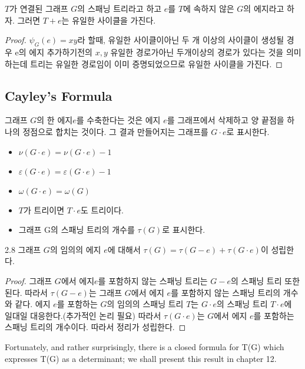 \begin{theorem}
    $T$가 연결된 그래프 $G$의 스패닝 트리라고 하고 $e$를 $T$에 속하지 않은 $G$의 에지라고 하자. 그러면 $T + e$는 유일한 사이클을 가진다.
\end{theorem}
\begin{proof}
    $\psi_G(e) = xy$라 할때, 유일한 사이클이아닌 두 개 이상의 사이클이 생성될 경우  e의 에지 추가하기전의 $x, y$ 유일한 경로가아닌 두개이상의 경로가 있다는 것을 의미하는데 트리는 유일한 경로임이 이미 증명되었으므로 유일한 사이클을 가진다.
\end{proof}
\subsection{Cayley's Formula}
\begin{dfn}[contract]
    그래프 $G$의 한 에지$e$를 수축한다는 것은 에지 $e$를 그래프에서 삭제하고 양 끝점을 하나의 정점으로 합치는 것이다. 그 결과 만들어지는 그래프를 $G \cdot e$로 표시한다.
    \begin{itemize}
        \item $\nu(G \cdot e) = \nu(G \cdot e) - 1$
        \item $\varepsilon(G \cdot e) = \varepsilon(G \cdot e)-1$
        \item $\omega(G \cdot e) = \omega(G)$
        \item  $T$가 트리이면 $T \cdot e$도 트리이다.
        \item 그래프 G의 스패닝 트리의 개수를 $\tau(G)$로 표시한다.
    \end{itemize}
\end{dfn}

\begin{theorem}
    2.8 그래프 $G$의 임의의 에지 $e$에 대해서 $\tau(G) =\tau(G-e) + \tau(G \cdot e)$이 성립한다.
\end{theorem}

\begin{proof}
    그래프 $G$에서 에지$e$를 포함하지 않는 스패닝 트리는 $G-e$의 스패닝 트리 또한 된다.
    따라서 $\tau(G-e)$는 그래프 $G$에서 에지 $e$를 포함하지 않는 스패닝 트리의 개수와 같다.
    에지 $e$를 포함하는 $G$의 임의의 스패닝 트리 $T$는 $G \cdot e$의 스패닝 트리 $T \cdot e$에 일대일 대응한다.(추가적인 논리 필요) 따라서 $\tau(G \cdot e)$는 $G$에서 에지 $e$를 포함하는 스패닝 트리의 개수이다. 따라서 정리가 성립한다.
\end{proof}


Fortunately, and rather surprisingly, there is a closed formula for T(G) which expresses T(G) as a determinant; 
we shall present this result in chapter 12.


